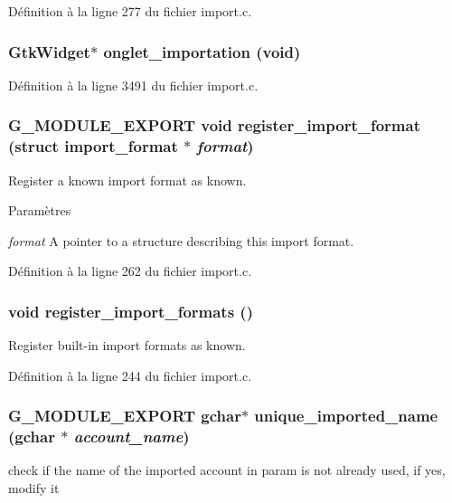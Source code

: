 Définition à la ligne 277 du fichier import.c.

\subsubsection[{onglet\_\-importation}]{\setlength{\rightskip}{0pt plus 5cm}GtkWidget$\ast$ onglet\_\-importation (void)}\label{import_8c_a248bf76497a7936687f79e28da9ff0e8}


Définition à la ligne 3491 du fichier import.c.

\subsubsection[{register\_\-import\_\-format}]{\setlength{\rightskip}{0pt plus 5cm}G\_\-MODULE\_\-EXPORT void register\_\-import\_\-format (struct {\bf import\_\-format} $\ast$ {\em format})}\label{import_8c_a363697c684d8b70752d14c4a6eef0f73}
Register a known import format as known.


\begin{DoxyParams}{Paramètres}
\item[{\em format}]A pointer to a structure describing this import format. \end{DoxyParams}


Définition à la ligne 262 du fichier import.c.

\subsubsection[{register\_\-import\_\-formats}]{\setlength{\rightskip}{0pt plus 5cm}void register\_\-import\_\-formats ()}\label{import_8c_a24f0a83e63a5c81379d5971d41256324}
Register built-\/in import formats as known. 

Définition à la ligne 244 du fichier import.c.

\subsubsection[{unique\_\-imported\_\-name}]{\setlength{\rightskip}{0pt plus 5cm}G\_\-MODULE\_\-EXPORT gchar$\ast$ unique\_\-imported\_\-name (gchar $\ast$ {\em account\_\-name})}\label{import_8c_a749d3f56e4864750955ed170111dca08}
check if the name of the imported account in param is not already used, if yes, modify it



